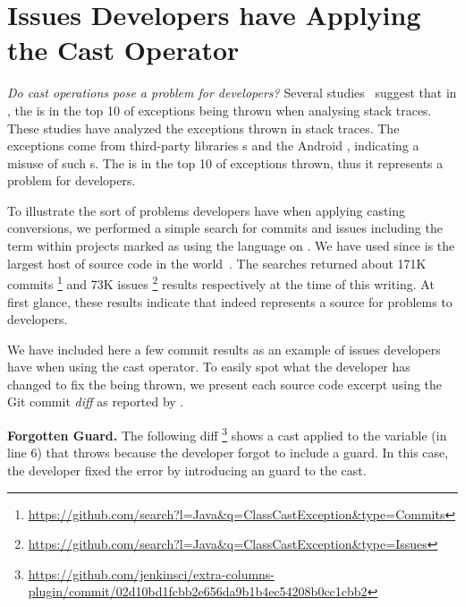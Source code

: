 \section{Issues Developers have Applying the Cast Operator}

\emph{Do cast operations pose a problem for developers?}
Several studies~\citep{kechagiaUndocumentedUncheckedExceptions2014,coelhoUnveilingExceptionHandling2015,zhitnitskyTop10Exception2016}
suggest that in \java{},
%
%
the  is in the top 10 of exceptions being thrown when analysing stack traces.
These studies have analyzed the exceptions thrown in stack traces.
The exceptions come from third-party libraries \api{}s and the Android \api{},
indicating a misuse of such \api{}s.
The  is in the top 10 of exceptions thrown,
thus it represents a problem for developers.

To illustrate the sort of problems developers have when applying casting conversions,
%
%
we performed a simple search for commits and issues including the term  within projects marked as using the \java{} language on \github{}.
We have used \github{} since is the largest host of source code in the world~\citep{gousiosLeanGHTorrentGitHub2014}.
The searches returned about 171K commits%
\footnote{\url{https://github.com/search?l=Java&q=ClassCastException&type=Commits}}
and 73K issues%
\footnote{\url{https://github.com/search?l=Java&q=ClassCastException&type=Issues}}
%
%
results respectively at the time of this writing.
At first glance, these results indicate that  indeed represents a source for problems to developers.

We have included here a few commit results as an example of issues developers have when using the cast operator.
To easily spot what the developer has changed to fix the  being thrown,
we present each source code excerpt using the Git commit \emph{diff} as reported by \github{}.

\textbf{Forgotten Guard.}
The following diff%
\footnote{\url{https://github.com/jenkinsci/extra-columns-plugin/commit/02d10bd1fcbb2e656da9b1b4ec54208b0cc1cbb2}}
shows a cast applied to the variable  (in line 6) that throws  because the developer forgot to include a guard.
In this case, the developer fixed the error by introducing an  guard to the cast.

